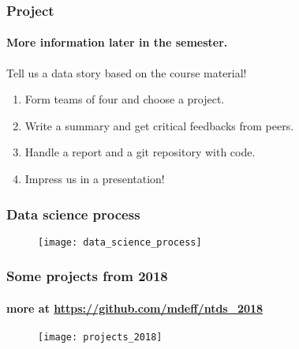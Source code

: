 \documentclass[aspectratio=169]{beamer}
\begin{document}
\begin{frame}
	\frametitle{Project}
	\framesubtitle{More information later in the semester.}
	\begin{center}
		Tell us a data story based on the course material!
	\end{center}
	\vfill
	\begin{enumerate}
		\item Form teams of four and choose a project.
		\vfill
		\item Write a summary and get critical feedbacks from peers. %
		\vfill
		\item Handle a report and a git repository with code.
		\vfill
		\item Impress us in a presentation!
	\end{enumerate}
\end{frame}



\begin{frame}
	\frametitle{Data science process}
	\begin{figure}
		\texttt{[image: data\_science\_process]}
	\end{figure}
\end{frame}


\begin{frame}
	\frametitle{Some projects from 2018}
	\framesubtitle{more at \url{https://github.com/mdeff/ntds_2018}}
	\begin{figure}
		\texttt{[image: projects\_2018]}
	\end{figure}
\end{frame}

\end{document}
